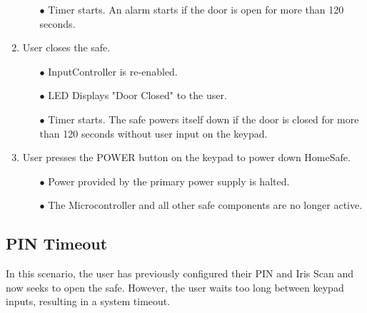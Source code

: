 \documentclass{article}
\begin{document}
\begin{enumerate}
\begin{enumerate}
        \item[$\bullet$] Timer starts. An alarm starts if the door is open for more than 120 seconds.
    \end{enumerate}
    \item User closes the safe.
    \begin{enumerate}
        \item[$\bullet$] InputController is re-enabled.
        \item[$\bullet$] LED Displays "Door Closed" to the user.
        \item[$\bullet$] Timer starts. The safe powers itself down if the door is closed for more than 120 seconds without user input on the keypad.
    \end{enumerate}
    \item User presses the POWER button on the keypad to power down HomeSafe.
    \begin{enumerate}
        \item[$\bullet$] Power provided by the primary power supply is halted.
        \item[$\bullet$] The Microcontroller and all other safe components are no longer active.
    \end{enumerate}

\end{enumerate}

\subsection{PIN Timeout}
In this scenario, the user has previously configured their PIN and Iris Scan and now seeks to open the safe. However, the user waits too long between keypad inputs, resulting in a system timeout.
\end{document}
